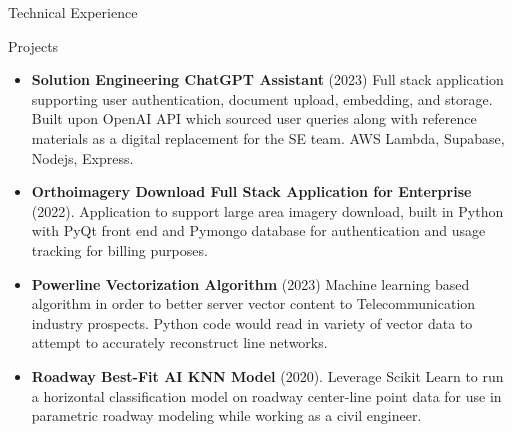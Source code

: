 \documentclass[]{mcdowellcv}
\begin{document}
	\begin{cvsection}{Technical Experience}
		\begin{cvsubsection}{Projects}{}{}
			\begin{itemize}
				\item \textbf{Solution Engineering ChatGPT Assistant} (2023) Full stack application supporting user authentication, document upload, embedding, and storage. Built upon OpenAI API which sourced user queries along with reference materials as a digital replacement for the SE team. AWS Lambda, Supabase, Nodejs, Express.
				\item \textbf{Orthoimagery Download Full Stack Application for Enterprise} (2022). Application to support large area imagery download, built in Python with PyQt front end and Pymongo database for authentication and usage tracking for billing purposes.
                \item \textbf{Powerline Vectorization Algorithm} (2023) 
                Machine learning based algorithm in order to better server vector content to Telecommunication industry prospects. Python code would read in variety of vector data to attempt to accurately reconstruct line networks.
				\item \textbf{Roadway Best-Fit AI KNN Model} (2020).  Leverage Scikit Learn to run a horizontal classification model on roadway center-line point data for use in parametric roadway modeling while working as a civil engineer. 
			\end{itemize}
		\end{cvsubsection}
	\end{cvsection}
	
         
\end{document}

